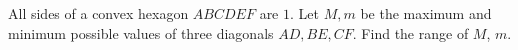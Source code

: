 All sides of a convex hexagon $ABCDEF$ are $1$. Let $M,m$ be the maximum and minimum possible values of three diagonals $AD,BE,CF$. Find the range of $M$, $m$.